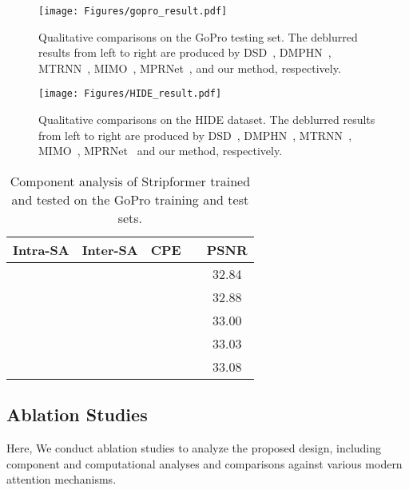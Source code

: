 \begin{figure}[t!]
\centering
\texttt{[image: Figures/gopro\_result.pdf]}
\caption{Qualitative comparisons on the GoPro testing set. The deblurred results from left to right are produced by DSD~\cite{gao2019dynamic}, DMPHN~\cite{Zhang_2019_CVPR}, MTRNN~\cite{MT_2020_ECCV}, MIMO~\cite{MIMO}, MPRNet~\cite{Zamir2021MPRNet}, and our method, respectively.}
\label{fig:Visualization_Result_GoPro}
\end{figure}

\begin{figure}[t!]
\centering
\texttt{[image: Figures/HIDE\_result.pdf]}
\caption{Qualitative comparisons on the HIDE dataset. The deblurred results from left to right are produced by DSD~\cite{gao2019dynamic}, DMPHN~\cite{Zhang_2019_CVPR}, MTRNN~\cite{MT_2020_ECCV}, MIMO~\cite{MIMO}, MPRNet~\cite{Zamir2021MPRNet} and our method, respectively.}
\label{fig:Visualization_Result_HIDE}
\end{figure}

\begin{table}[t!]
\centering
\setlength{\tabcolsep}{4.5mm}
\caption{Component analysis of Stripformer trained and tested on the GoPro training and test sets.}
\begin{tabular}{cccc|c}
\hline
Intra-SA & Inter-SA & CPE &  & PSNR \\
\hline
 &       &     &       & 32.84 \\
      &  &     &       & 32.88 \\
 &  &     &       & 33.00 \\
 &  &  &       & 33.03 \\
 &  &  &  & 33.08 \\
\hline
\end{tabular}
\label{tab:ablation}
\end{table}

\subsection{Ablation Studies}
Here, We conduct ablation studies to analyze the proposed design, including component and computational analyses and comparisons against various modern attention mechanisms.


